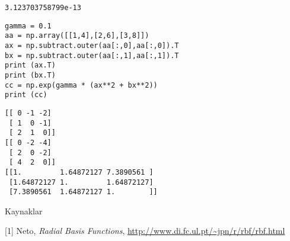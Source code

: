 \documentclass[12pt,fleqn]{article}\usepackage{../../common}
\begin{document}
\begin{verbatim}
3.123703758799e-13
\end{verbatim}





\begin{verbatim}
gamma = 0.1
aa = np.array([[1,4],[2,6],[3,8]])
ax = np.subtract.outer(aa[:,0],aa[:,0]).T
bx = np.subtract.outer(aa[:,1],aa[:,1]).T
print (ax.T)
print (bx.T)
cc = np.exp(gamma * (ax**2 + bx**2))
print (cc)
\end{verbatim}

\begin{verbatim}
[[ 0 -1 -2]
 [ 1  0 -1]
 [ 2  1  0]]
[[ 0 -2 -4]
 [ 2  0 -2]
 [ 4  2  0]]
[[1.         1.64872127 7.3890561 ]
 [1.64872127 1.         1.64872127]
 [7.3890561  1.64872127 1.        ]]
\end{verbatim}














Kaynaklar

[1] Neto, {\em Radial Basis Functions}, \url{http://www.di.fc.ul.pt/~jpn/r/rbf/rbf.html}
\end{document}
